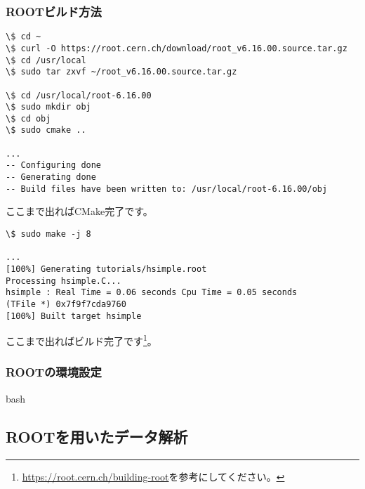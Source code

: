 \documentclass[10pt,a4j]{jarticle}
\begin{document}
\subsubsection{ROOTビルド方法}

\begin{lstlisting}
\$ cd ~
\$ curl -O https://root.cern.ch/download/root_v6.16.00.source.tar.gz
\$ cd /usr/local
\$ sudo tar zxvf ~/root_v6.16.00.source.tar.gz

\$ cd /usr/local/root-6.16.00
\$ sudo mkdir obj
\$ cd obj
\$ sudo cmake ..

...
-- Configuring done
-- Generating done
-- Build files have been written to: /usr/local/root-6.16.00/obj 
\end{lstlisting}

ここまで出ればCMake完了です。

\begin{lstlisting}[escapechar=!]
\$ sudo make -j 8

...
[100%] Generating tutorials/hsimple.root
Processing hsimple.C...
hsimple : Real Time = 0.06 seconds Cpu Time = 0.05 seconds
(TFile *) 0x7f9f7cda9760
[100%] Built target hsimple 
\end{lstlisting}

ここまで出ればビルド完了です\footnote{\url{https://root.cern.ch/building-root}を参考にしてください。}。

\subsubsection{ROOTの環境設定}

bash

\subsection{ROOTを用いたデータ解析}
\end{document}
